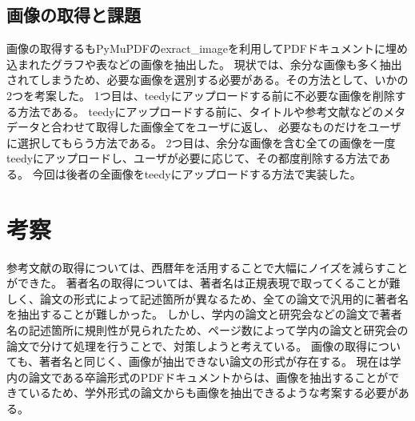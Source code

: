 \documentclass{ltjsarticle}
\begin{document}
\subsection{画像の取得と課題}
画像の取得するもPyMuPDFのexract\_imageを利用してPDFドキュメントに埋め込まれたグラフや表などの画像を抽出した。
現状では、余分な画像も多く抽出されてしまうため、必要な画像を選別する必要がある。その方法として、いかの2つを考案した。
1つ目は、teedyにアップロードする前に不必要な画像を削除する方法である。
teedyにアップロードする前に、タイトルや参考文献などのメタデータと合わせて取得した画像全てをユーザに返し、
必要なものだけをユーザに選択してもらう方法である。
2つ目は、余分な画像を含む全ての画像を一度teedyにアップロードし、ユーザが必要に応じて、その都度削除する方法である。
今回は後者の全画像をteedyにアップロードする方法で実装した。


\section{考察}
参考文献の取得については、西暦年を活用することで大幅にノイズを減らすことができた。
著者名の取得については、著者名は正規表現で取ってくることが難しく、論文の形式によって記述箇所が異なるため、全ての論文で汎用的に著者名を抽出することが難しかった。
しかし、学内の論文と研究会などの論文で著者名の記述箇所に規則性が見られたため、ページ数によって学内の論文と研究会の論文で分けて処理を行うことで、対策しようと考えている。
画像の取得についても、著者名と同じく、画像が抽出できない論文の形式が存在する。
現在は学内の論文である卒論形式のPDFドキュメントからは、画像を抽出することができているため、学外形式の論文からも画像を抽出できるような考案する必要がある。
\end{document}
